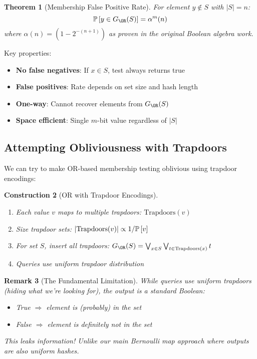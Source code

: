 \documentclass[11pt,final,hidelinks]{article}
\newtheorem{theorem}{Theorem}[section]
\newtheorem{remark}[theorem]{Remark}
\newtheorem{construction}[theorem]{Construction}
\begin{document}
\begin{theorem}[Membership False Positive Rate]
For element $y \notin S$ with $|S| = n$:
\begin{equation}
\Prob{y \in G_{\OR}(S)} = \alpha^m(n)
\end{equation}
where $\alpha(n) = (1 - 2^{-(n+1)})$ as proven in the original Boolean algebra work.
\end{theorem}

Key properties:
\begin{itemize}
    \item \textbf{No false negatives}: If $x \in S$, test always returns true
    \item \textbf{False positives}: Rate depends on set size and hash length
    \item \textbf{One-way}: Cannot recover elements from $G_{\OR}(S)$
    \item \textbf{Space efficient}: Single $m$-bit value regardless of $|S|$
\end{itemize}

\subsection{Attempting Obliviousness with Trapdoors}

We can try to make OR-based membership testing oblivious using trapdoor encodings:

\begin{construction}[OR with Trapdoor Encodings]
\begin{enumerate}
    \item Each value $v$ maps to multiple trapdoors: $\text{Trapdoors}(v)$
    \item Size trapdoor sets: $|\text{Trapdoors}(v)| \propto 1/\mathbb{P}\left[v\right]$
    \item For set $S$, insert all trapdoors: $G_{\OR}(S) = \bigvee_{x \in S} \bigvee_{t \in \text{Trapdoors}(x)} t$
    \item Queries use uniform trapdoor distribution
\end{enumerate}
\end{construction}

\begin{remark}[The Fundamental Limitation]
While queries use uniform trapdoors (hiding what we're looking for), the output is a standard Boolean:
\begin{itemize}
    \item True $\Rightarrow$ element is (probably) in the set
    \item False $\Rightarrow$ element is definitely not in the set
\end{itemize}
This leaks information! Unlike our main Bernoulli map approach where outputs are also uniform hashes.
\end{remark}
\end{document}
